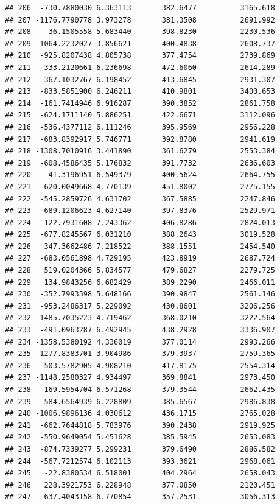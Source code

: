 \documentclass[
]{article}
\begin{document}
\begin{verbatim}
## 206  -730.7880030 6.363113       382.6477          3165.618
## 207 -1176.7790778 3.973278       381.3508          2691.992
## 208    36.1505558 5.683440       398.8230          2230.536
## 209 -1064.2232027 3.856621       400.4838          2608.737
## 210  -925.8207438 4.805738       377.4754          2739.869
## 211   333.2120661 6.236698       472.6060          2614.289
## 212  -367.1032767 6.198452       413.6845          2931.307
## 213  -833.5851900 6.246211       410.9801          3400.653
## 214  -161.7414946 6.916287       390.3852          2861.758
## 215  -624.1711140 5.886251       422.6671          3112.096
## 216  -536.4377112 6.111246       395.9569          2956.228
## 217  -683.8392917 5.746771       392.8780          2941.619
## 218 -1308.7010916 3.441890       361.6279          2553.384
## 219  -608.4586435 5.176832       391.7732          2636.603
## 220   -41.3196951 6.549379       400.5624          2664.755
## 221  -620.0049668 4.770139       451.8002          2775.155
## 222  -545.2859726 4.631702       367.5885          2247.846
## 223  -689.1206623 4.627140       397.8376          2529.971
## 224   122.7931608 7.243362       406.8286          2824.013
## 225  -677.8245567 6.031210       388.2643          3019.528
## 226   347.3662486 7.218522       388.1551          2454.540
## 227  -683.0561898 4.729195       423.8919          2687.724
## 228   519.0204366 5.834577       479.6827          2279.725
## 229   134.9843256 6.682429       389.2290          2466.011
## 230  -352.7993598 5.648166       390.9847          2561.146
## 231  -953.2486317 5.229092       430.8601          3206.256
## 232 -1485.7035223 4.719462       368.0210          3222.564
## 233  -491.0963287 6.492945       438.2928          3336.907
## 234 -1358.5380192 4.336019       377.0114          2993.266
## 235 -1277.8383701 3.904986       379.3937          2759.365
## 236  -503.5782905 4.908210       417.8175          2554.314
## 237 -1148.2580327 4.934497       369.8841          2973.450
## 238  -169.5954704 6.571268       379.3544          2662.435
## 239  -584.6564939 6.228809       385.6567          2986.838
## 240 -1006.9896136 4.030612       436.1715          2765.028
## 241  -662.7644818 5.783976       390.2438          2919.925
## 242  -550.9649054 5.451628       385.5945          2653.083
## 243  -874.7339277 5.299231       379.6490          2886.582
## 244  -567.7212574 6.102113       393.3621          2968.061
## 245   -22.8380534 6.518001       404.2964          2658.043
## 246   228.3921753 6.228948       377.0850          2120.451
## 247  -637.4043158 6.770854       357.2531          3056.313

\end{verbatim}
\end{document}
